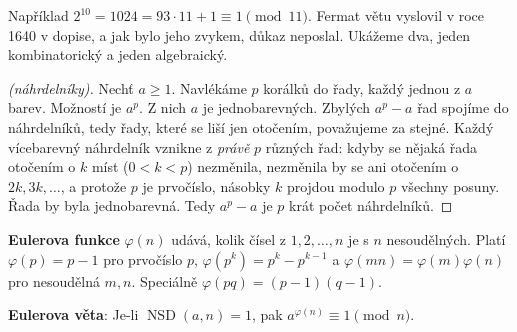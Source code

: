 Například $2^{10} = 1024 = 93\cdot 11 + 1\equiv 1\pmod{11}$. Fermat větu vyslovil v roce 1640 v dopise, a jak bylo jeho zvykem, důkaz neposlal. Ukážeme dva, jeden kombinatorický a jeden algebraický.

\begin{proof}[(náhrdelníky)]
  Nechť $a\geq 1$. Navlékáme $p$ korálků do řady, každý jednou z $a$ barev. Možností je $a^p$. Z nich $a$ je jednobarevných. Zbylých $a^p - a$ řad spojíme do náhrdelníků, tedy řady, které se liší jen otočením, považujeme za stejné. Každý vícebarevný náhrdelník vznikne z \textit{právě} $p$ různých řad: kdyby se nějaká řada otočením o $k$ míst ($0 < k < p$) nezměnila, nezměnila by se ani otočením o $2k, 3k, \ldots$, a protože $p$ je prvočíslo, násobky $k$ projdou modulo $p$ všechny posuny. Řada by byla jednobarevná. Tedy $a^p - a$ je $p$ krát počet náhrdelníků.
\end{proof}

\begin{center}
\end{center}

\begin{definitionbox}
  \textbf{Eulerova funkce} $\varphi(n)$ udává, kolik čísel z $1, 2, \ldots, n$ je s $n$ nesoudělných. Platí $\varphi(p) = p - 1$ pro prvočíslo $p$, $\varphi(p^k) = p^k - p^{k-1}$ a $\varphi(mn) = \varphi(m)\varphi(n)$ pro nesoudělná $m, n$. Speciálně $\varphi(pq) = (p - 1)(q - 1)$.

  \textbf{Eulerova věta}: Je-li $\operatorname{NSD}(a, n) = 1$, pak $a^{\varphi(n)}\equiv 1\pmod{n}$.
\end{definitionbox}

